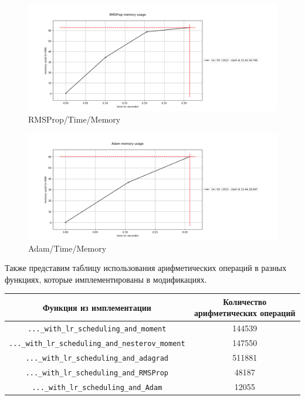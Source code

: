 \documentclass[12pt, a4paper, oneside, final]{article}
\begin{document}
	\begin{figure}[H]
	\centering
	\includegraphics[scale = 0.6]{Image/T4_RMS.png}
	\caption*{RMSProp/Time/Memory}
\end{figure}
	\begin{figure}[H]
	\centering
	\includegraphics[scale = 0.6]{Image/T4_ADAM.png}
	\caption*{Adam/Time/Memory}
\end{figure}
	Также представим таблицу использования арифметических операций в разных функциях, которые имплементированы в модификациях.
		\begin{table}[H]
		\centering
		\begin{tabular}{|c|c|}
			Функция из имплементации & Количество арифметических операций \\ \hline
			\texttt{...\_with\_lr\_scheduling\_and\_moment} & 144539 \\
			\texttt{...\_with\_lr\_scheduling\_and\_nesterov\_moment} & 147550 \\
			\texttt{...\_with\_lr\_scheduling\_and\_adagrad} & 511881 \\
			\texttt{...\_with\_lr\_scheduling\_and\_RMSProp} & 48187 \\
			\texttt{...\_with\_lr\_scheduling\_and\_Adam} & 12055
		\end{tabular}
	\end{table}
\end{document}
